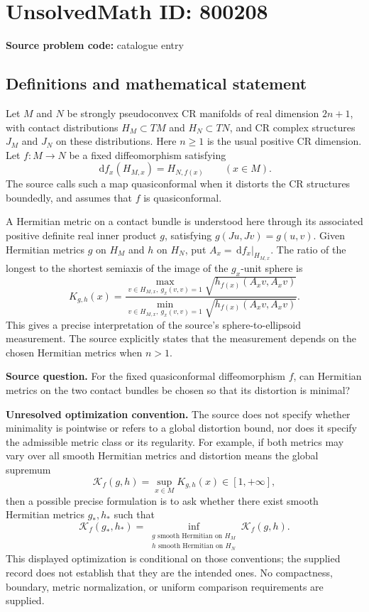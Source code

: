 \documentclass[11pt]{article}
\newcommand{\dd}{\,\mathrm{d}}
\begin{document}
\section*{UnsolvedMath ID: 800208}
\textbf{Source problem code:} catalogue entry
\subsection{Definitions and mathematical statement}
Let \(M\) and \(N\) be strongly pseudoconvex CR manifolds of real dimension \(2n+1\), with contact distributions \(H_M\subset TM\) and \(H_N\subset TN\), and CR complex structures \(J_M\) and \(J_N\) on these distributions. Here \(n\geq 1\) is the usual positive CR dimension. Let \(f:M\to N\) be a fixed diffeomorphism satisfying
\[
\dd f_x(H_{M,x})=H_{N,f(x)}\qquad(x\in M).
\]
The source calls such a map quasiconformal when it distorts the CR structures boundedly, and assumes that \(f\) is quasiconformal.

A Hermitian metric on a contact bundle is understood here through its associated positive definite real inner product \(g\), satisfying \(g(Ju,Jv)=g(u,v)\). Given Hermitian metrics \(g\) on \(H_M\) and \(h\) on \(H_N\), put \(A_x=\dd f_x|_{H_{M,x}}\). The ratio of the longest to the shortest semiaxis of the image of the \(g_x\)-unit sphere is
\[
K_{g,h}(x)=
\frac{\displaystyle\max_{v\in H_{M,x},\ g_x(v,v)=1}
\sqrt{h_{f(x)}(A_xv,A_xv)}}
{\displaystyle\min_{v\in H_{M,x},\ g_x(v,v)=1}
\sqrt{h_{f(x)}(A_xv,A_xv)}}.
\]
This gives a precise interpretation of the source's sphere-to-ellipsoid measurement. The source explicitly states that the measurement depends on the chosen Hermitian metrics when \(n>1\).

\textbf{Source question.} For the fixed quasiconformal diffeomorphism \(f\), can Hermitian metrics on the two contact bundles be chosen so that its distortion is minimal?

\textbf{Unresolved optimization convention.} The source does not specify whether minimality is pointwise or refers to a global distortion bound, nor does it specify the admissible metric class or its regularity. For example, if both metrics may vary over all smooth Hermitian metrics and distortion means the global supremum
\[
\mathcal K_f(g,h)=\sup_{x\in M}K_{g,h}(x)\in[1,+\infty],
\]
then a possible precise formulation is to ask whether there exist smooth Hermitian metrics \(g_*,h_*\) such that
\[
\mathcal K_f(g_*,h_*)=
\inf_{\substack{g\text{ smooth Hermitian on }H_M\\
                 h\text{ smooth Hermitian on }H_N}}
\mathcal K_f(g,h).
\]
This displayed optimization is conditional on those conventions; the supplied record does not establish that they are the intended ones. No compactness, boundary, metric normalization, or uniform comparison requirements are supplied.
\end{document}

